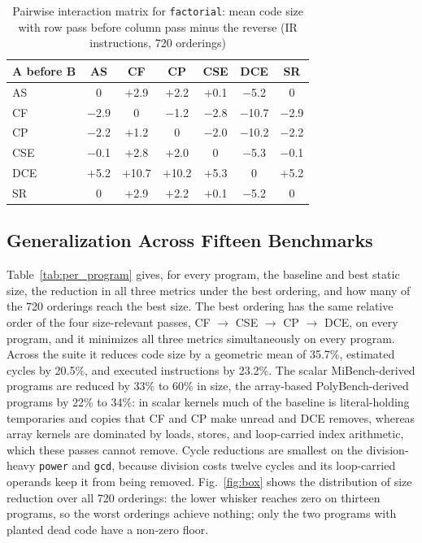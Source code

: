 \documentclass[conference]{IEEEtran}
\begin{document}
\begin{table}[!htbp]
\centering
\caption{Pairwise interaction matrix for \texttt{factorial}: mean code size with row pass before column pass minus the reverse (IR instructions, 720 orderings)}
\label{tab:pass_interaction}
\renewcommand{\arraystretch}{1.1}
{\footnotesize
\begin{tabularx}{\columnwidth}{@{}Xcccccc@{}}
\toprule
\textbf{A before B} & \textbf{AS} & \textbf{CF} & \textbf{CP} & \textbf{CSE} & \textbf{DCE} & \textbf{SR} \\
\midrule
AS  & 0      & $+$2.9 & $+$2.2 & $+$0.1 & $-$5.2  & 0 \\
CF  & $-$2.9 & 0      & $-$1.2 & $-$2.8 & $-$10.7 & $-$2.9 \\
CP  & $-$2.2 & $+$1.2 & 0      & $-$2.0 & $-$10.2 & $-$2.2 \\
CSE & $-$0.1 & $+$2.8 & $+$2.0 & 0      & $-$5.3  & $-$0.1 \\
DCE & $+$5.2 & $+$10.7 & $+$10.2 & $+$5.3 & 0     & $+$5.2 \\
SR  & 0      & $+$2.9 & $+$2.2 & $+$0.1 & $-$5.2  & 0 \\
\bottomrule
\end{tabularx}
}
\end{table}

\subsection{Generalization Across Fifteen Benchmarks}
\label{sec:classes}
Table~\ref{tab:per_program} gives, for every program, the baseline and best static size, the reduction in all three metrics under the best ordering, and how many of the 720 orderings reach the best size. The best ordering has the same relative order of the four size-relevant passes, CF $\to$ CSE $\to$ CP $\to$ DCE, on every program, and it minimizes all three metrics simultaneously on every program. Across the suite it reduces code size by a geometric mean of 35.7\%, estimated cycles by 20.5\%, and executed instructions by 23.2\%. The scalar MiBench-derived programs are reduced by 33\% to 60\% in size, the array-based PolyBench-derived programs by 22\% to 34\%: in scalar kernels much of the baseline is literal-holding temporaries and copies that CF and CP make unread and DCE removes, whereas array kernels are dominated by loads, stores, and loop-carried index arithmetic, which these passes cannot remove. Cycle reductions are smallest on the division-heavy \texttt{power} and \texttt{gcd}, because division costs twelve cycles and its loop-carried operands keep it from being removed. Fig.~\ref{fig:box} shows the distribution of size reduction over all 720 orderings: the lower whisker reaches zero on thirteen programs, so the worst orderings achieve nothing; only the two programs with planted dead code have a non-zero floor.
\end{document}
